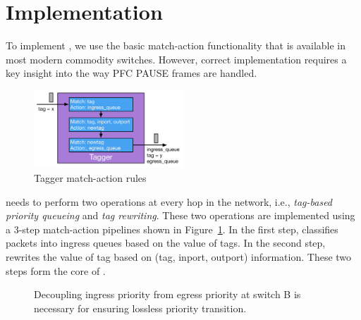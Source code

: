 \section{Implementation}\label{sec:implementation}

To implement \sysname{}, we use the basic match-action functionality that is
available in most modern commodity switches. However, correct implementation
requires a key insight into the way PFC PAUSE frames are handled.

\begin{figure}
	\hspace{-0.2in}
	\centering
	\includegraphics[width=0.5\textwidth] {figs/Tagger}
	\caption{Tagger match-action rules}\label{fig:tagger}
	
\end{figure}

 \sysname{} needs to perform two operations at every
hop in the network, i.e., {\em tag-based priority queueing} and {\em tag
rewriting}.  These two operations are implemented using a 3-step match-action
pipelines shown in Figure~\ref{fig:tagger}.  In the first step, \sysname{}
classifies packets into ingress queues based on the value of tags. In the second
step, \sysname{} rewrites the value of tag based on (tag, inport, outport)
information. These two steps form the core of \sysname{}.
 
\begin{figure}[t]
 	\centering

 	\caption{Decoupling ingress priority from egress priority at switch B is necessary for ensuring lossless priority transition.}\label{fig:prioritydecoupling}
\end{figure}

